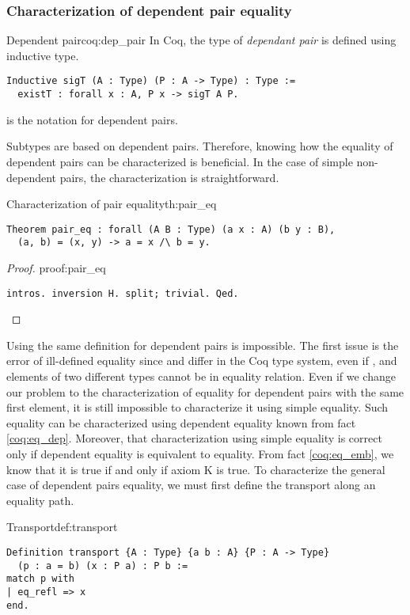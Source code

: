 \subsubsection{Characterization of dependent pair equality}
\begin{coq}{Dependent pair}{coq:dep_pair}
In Coq, the type of \emph{dependant pair} is defined using inductive type.
\begin{verbatim}
Inductive sigT (A : Type) (P : A -> Type) : Type :=
  existT : forall x : A, P x -> sigT A P.
\end{verbatim}
 is the notation for dependent pairs.
\end{coq}
Subtypes are based on dependent pairs. Therefore, knowing how the equality of dependent pairs can be characterized is beneficial. In the case of simple non-dependent pairs, the characterization is straightforward.
\begin{theo}{Characterization of pair equality}{th:pair_eq}
\begin{verbatim}
Theorem pair_eq : forall (A B : Type) (a x : A) (b y : B),
  (a, b) = (x, y) -> a = x /\ b = y.
\end{verbatim}
\end{theo}
\begin{proof}{}{proof:pair_eq}
\begin{verbatim}
intros. inversion H. split; trivial. Qed.
\end{verbatim}
\end{proof}
Using the same definition for dependent pairs is impossible. The first issue is the error of ill-defined equality since  and  differ in the Coq type system, even if , and elements of two different types cannot be in equality relation. Even if we change our problem to the characterization of equality for dependent pairs with the same first element, it is still impossible to characterize it using simple equality. Such equality can be characterized using dependent equality known from fact \ref{coq:eq_dep}. Moreover, that characterization using simple equality is correct only if dependent equality is equivalent to equality. From fact \ref{coq:eq_emb}, we know that it is true if and only if axiom K is true. To characterize the general case of dependent pairs equality, we must first define the transport along an equality path.
\begin{defi}{Transport}{def:transport}
\begin{verbatim}
Definition transport {A : Type} {a b : A} {P : A -> Type} 
  (p : a = b) (x : P a) : P b :=
match p with
| eq_refl => x
end.
\end{verbatim}
\end{defi}
